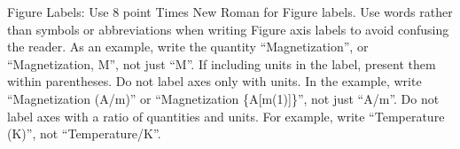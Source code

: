 \documentclass[conference]{IEEEtran}
\begin{document}
Figure Labels: Use 8 point Times New Roman for Figure labels. Use words
rather than symbols or abbreviations when writing Figure axis labels to
avoid confusing the reader. As an example, write the quantity
``Magnetization'', or ``Magnetization, M'', not just ``M''. If including
units in the label, present them within parentheses. Do not label axes only
with units. In the example, write ``Magnetization (A/m)'' or ``Magnetization
\{A[m(1)]\}'', not just ``A/m''. Do not label axes with a ratio of
quantities and units. For example, write ``Temperature (K)'', not
``Temperature/K''.






\end{document}
